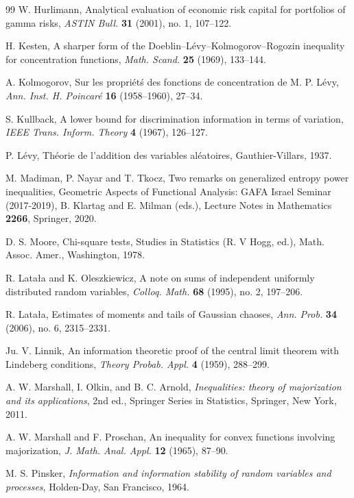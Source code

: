 \documentclass[11pt]{amsart}
\newcommand{\1}{\mathbf{1}}
\theoremstyle{definition}
\theoremstyle{definition}
\theoremstyle{remark}
\begin{document}
\begin{thebibliography}{99}
 W. Hurlimann, Analytical evaluation of economic risk capital for portfolios of gamma risks, \textit{ASTIN Bull.} \textbf{31} (2001), no. 1, 107--122.

 H. Kesten, A sharper form of the Doeblin–L\'evy–Kolmogorov–Rogozin inequality for concentration functions, \textit{Math. Scand.}  \textbf{25} (1969),  133--144.

 A. Kolmogorov, Sur les propri\'et\'s des fonctions de concentration de M. P. L\'evy, \textit{Ann. Inst. H. Poincaré}  \textbf{16} (1958–1960), 27--34.

 S. Kullback, A lower bound for discrimination information in terms of variation, \textit{IEEE Trans. Inform. Theory} \textbf{4} (1967), 126--127.

 P. Lévy, Th\'eorie de l'addition des variables al\'eatoires, Gauthier-Villars, 1937.

 M. Madiman, P. Nayar and T. Tkocz, Two remarks on generalized entropy power inequalities, Geometric Aspects of Functional Analysis: GAFA Israel Seminar (2017-2019), B. Klartag and E. Milman (eds.), Lecture Notes in Mathematics \textbf{2266}, Springer, 2020.

 D. S. Moore, Chi-square tests, Studies in Statistics (R. V Hogg, ed.), Math. Assoc. Amer., Washington, 1978.

R. Lata\l a and K. Oleszkiewicz,
A note on sums of independent uniformly distributed random variables, \textit{Colloq. Math.} \textbf{68} (1995), no. 2, 197--206. 

 R. Lata{\l}a, Estimates of moments and tails of Gaussian chaoses, \textit{Ann. Prob.} \textbf{34} (2006), no. 6, 2315--2331.

 Ju. V. Linnik, An information theoretic proof of the central limit theorem with Lindeberg conditions, \textit{Theory Probab. Appl.} \textbf{4} (1959), 288--299.

 A. W. Marshall, I. Olkin, and B. C. Arnold,
\textit{Inequalities: theory of majorization and its applications},
2nd ed., Springer Series in Statistics, Springer, New York, 2011.

 A. W. Marshall and F. Proschan, An inequality for convex functions involving majorization, \textit{J. Math. Anal. Appl.} \textbf{12} (1965), 87--90.

 M. S. Pinsker, \textit{Information and information stability of random variables and processes}, Holden-Day, San Francisco, 1964. 


\end{thebibliography}
\end{document}
